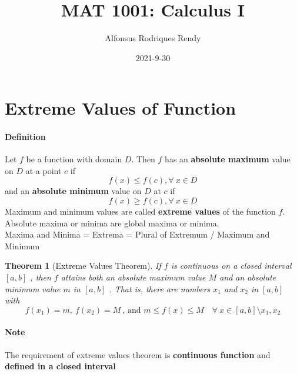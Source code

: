 \documentclass[12pt]{article}
\title{MAT 1001: Calculus I}
\author{Alfonsus Rodriques Rendy}
\date{2021-9-30}
\newtheorem{theorem}{Theorem}
\begin{document}
\begin{center}
    \hspace*{-0.5cm}
\end{center}

\section{Extreme Values of Function}
\paragraph{Definition}
Let $f$ be a function with domain $D$. Then $f$ has an \textbf{absolute maximum} value on $D$ at a point $c$ if
\[
    f(x) \leq f(c), \forall\: x \in D
\]
and an \textbf{absolute minimum} value on $D$ at $c$ if
\[
    f(x) \geq f(c), \forall\: x \in D
\]
Maximum and minimum values are called \textbf{extreme values} of the function $f$. 
Absolute maxima or minima are global maxima or minima. \\ 
Maxima and Minima = Extrema = Plural of Extremum / Maximum and Minimum

\begin{theorem}[Extreme Values Theorem] 
    If $f$ is continuous on a closed interval $[a, b]$ , then $f$ attains both an absolute maximum 
    value $M$ and an absolute minimum value $m$ in $[a, b]$ . That is, there are numbers $x_1$ and $x_2$ in $[a, b]$
    with 
    \[
        f(x_1) = m,\: f(x_2) = M\: \textrm{, and } m \leq f(x) \leq M\quad \forall\: x \in [a, b] \setminus x_1, x_2
    \]
    \label{extreme value}
\end{theorem}
\paragraph{Note} The requirement of extreme values theorem is \textbf{continuous function} and \textbf{defined in a closed interval}
\end{document}

